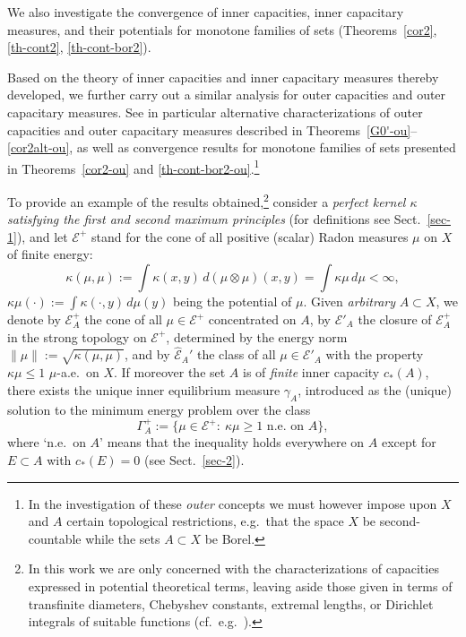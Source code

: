 \documentclass[12pt,a4paper,reqno]{amsart} %
\theoremstyle{lause}
\theoremstyle{maaritelma}
\theoremstyle{lause}
\theoremstyle{maaritelma}
\numberwithin{equation}{section}
\begin{document}
We also investigate the convergence of inner capacities, inner capacitary measures, and their potentials
for monotone families of sets (Theorems~\ref{cor2}, \ref{th-cont2}, \ref{th-cont-bor2}).

Based on the theory of
inner capacities and inner capacitary measures thereby developed, we further carry out a similar analysis for outer capacities and outer capacitary measures.
See in particular alternative characterizations of outer capacities and outer capacitary measures described in Theorems~\ref{G0'-ou}--\ref{cor2alt-ou}, as well as convergence results for monotone families of sets presented in Theorems~\ref{cor2-ou} and \ref{th-cont-bor2-ou}.\footnote{In the investigation of these {\it outer\/} concepts we must however impose upon $X$ and $A$ certain topological restrictions, e.g.\ that the space $X$ be second-countable while the sets $A\subset X$ be Borel.}

To provide an example of the results obtained,\footnote{In this work we are only concerned with the characterizations of capacities expressed in potential theoretical terms, leaving aside those given in terms of transfinite diameters, Chebyshev constants, extremal lengths, or Dirichlet integrals of suitable functions (cf.\ e.g.\ \cite{Ch2,FN,F0,ST,O1,Omon,Z0}).}
consider a {\it perfect kernel\/ $\kappa$ satisfying the first and second maximum principles\/} (for definitions see Sect.~\ref{sec-1}), and let $\mathcal E^+$ stand for the cone of all positive (scalar) Radon measures $\mu$ on $X$ of finite energy: \[\kappa(\mu,\mu):=\int\kappa(x,y)\,d(\mu\otimes\mu)(x,y)=\int\kappa\mu\,d\mu<\infty,\]
$\kappa\mu(\cdot):=\int\kappa(\cdot,y)\,d\mu(y)$ being the potential of $\mu$. Given {\it arbitrary\/} $A\subset X$, we denote by $\mathcal E^+_A$ the cone of all $\mu\in\mathcal E^+$ concentrated on $A$, by $\mathcal E'_A$ the closure of $\mathcal E^+_A$ in the strong topology on $\mathcal E^+$, determined by the energy norm $\|\mu\|:=\sqrt{\kappa(\mu,\mu)}$, and by $\widehat{\mathcal E}_A'$ the class of all $\mu\in\mathcal E'_A$ with the property $\kappa\mu\leqslant1$ $\mu$-a.e.\ on $X$. If moreover the set $A$ is of {\it finite\/} inner capacity $c_*(A)$, there exists the unique inner equilibrium measure $\gamma_A$, introduced as the (unique) solution to the minimum energy problem over the class
\[\Gamma^+_A:=\bigl\{\mu\in\mathcal E^+:\ \kappa\mu\geqslant1\text{ \ n.e.\ on $A$}\bigr\},\]
where `n.e.\ on $A$' means that the inequality holds everywhere on $A$ except for $E\subset A$ with $c_*(E)=0$ (see Sect.~\ref{sec-2}).
\end{document}
